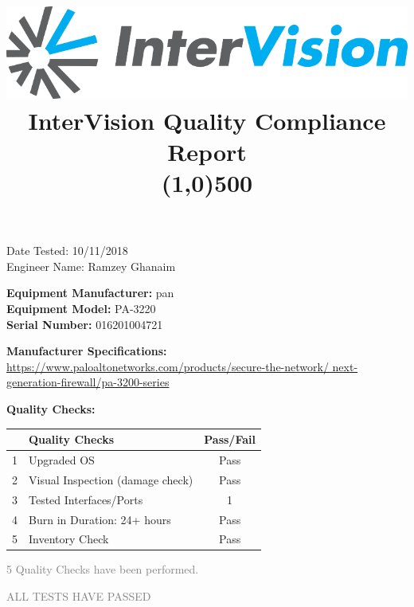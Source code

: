 \documentclass[12pt]{article}
\author{}
\title{\includegraphics[scale=1]{IV_logo.png}
\\InterVision Quality Compliance Report\\\line(1,0){500}\vspace{-8ex}}
\date{}
\begin{document}
\maketitle
\begin{flushright}
Date Tested: 10/11/2018\\
Engineer Name: Ramzey Ghanaim\\
\end{flushright}
\begin{flushleft}
\textbf{Equipment Manufacturer: } pan\\
\textbf{Equipment Model: } PA-3220\\
\textbf{Serial Number: } 016201004721\\
\end{flushleft}
\begin{flushleft}
\textbf{Manufacturer Specifications:} \\\url{https://www.paloaltonetworks.com/products/secure-the-network/ next-generation-firewall/pa-3200-series} \\
\end{flushleft}
\begin{flushleft}
\textbf{Quality Checks:} 
\end{flushleft}
\begin{table}[H]
\centering
\begin{tabular}{|c|l|c|}
 \hline
& \textbf{Quality Checks}  & \textbf{Pass/Fail} \\ \hline
1& Upgraded OS & Pass \\ \hline
2& Visual Inspection (damage check) & Pass \\ \hline
3& Tested Interfaces/Ports & 1 \\ \hline
4& Burn in Duration: 24+ hours & Pass \\ \hline
5& Inventory Check & Pass  \\ \hline
\end{tabular}
\end{table}
\begin{center}
\textcolor{gray}{\huge 5 Quality Checks have been performed.}

\textcolor{gray}{\huge ALL TESTS HAVE PASSED}
\end{center}
\end{document}

